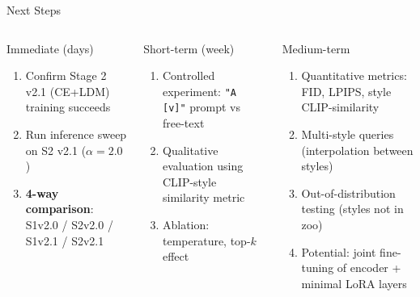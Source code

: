 \documentclass[aspectratio=169,10pt]{beamer}
\begin{document}
\begin{frame}[shrink=10]{Next Steps}
  \begin{columns}[T]
      \begin{block}{Immediate (days)}
        \begin{enumerate}
          \item Confirm Stage 2 v2.1 (CE+LDM) training succeeds
          \item Run inference sweep on S2 v2.1 ($\alpha=2.0$)
          \item \textbf{4-way comparison}: S1v2.0 / S2v2.0 / S1v2.1 / S2v2.1
        \end{enumerate}
      \end{block}
      \vspace{0.5em}
      \begin{block}{Short-term (week)}
        \begin{enumerate}
          \item Controlled experiment: \texttt{"A [v]"} prompt vs free-text
          \item Qualitative evaluation using CLIP-style similarity metric
          \item Ablation: temperature, top-$k$ effect
        \end{enumerate}
      \end{block}

      \begin{block}{Medium-term}
        \begin{enumerate}
          \item Quantitative metrics: FID, LPIPS, style CLIP-similarity
          \item Multi-style queries (interpolation between styles)
          \item Out-of-distribution testing (styles not in zoo)
          \item Potential: joint fine-tuning of encoder + minimal LoRA layers
        \end{enumerate}
      \end{block}
      \vspace{0.3em}
  \end{columns}
\end{frame}
\end{document}
